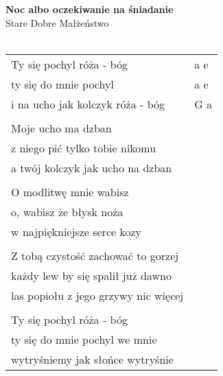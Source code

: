 \documentclass[a5paper]{article}
\begin{document}


\noindent
\fontsize{12pt}{15pt}\selectfont
\textbf{Noc albo oczekiwanie na śniadanie} \\
\fontsize{8pt}{10pt}\selectfont
Stare Dobre Małżeństwo \\ \\
\fontsize{10pt}{12pt}\selectfont
{}
\begin{tabular}{@{}p{7.50cm}p{3cm}@{}}
\noindent
Ty się pochyl róża - bóg & a e \\
ty się do mnie pochyl & a e \\
i na ucho jak kolczyk róża - bóg & G a \\ \\

Moje ucho ma dzban \\
z niego pić tylko tobie nikomu \\
a twój kolczyk jak ucho na dzban \\ \\

O modlitwę mnie wabisz\\
o, wabisz że błysk noża \\
w najpiękniejsze serce kozy  \\\\

Z tobą czystość zachować to gorzej\\ 
każdy lew by się spalił już dawno \\
las popiołu z jego grzywy nic więcej \\\\

Ty się pochyl róża - bóg \\
ty się do mnie pochyl we mnie \\
wytryśniemy jak słońce wytryśnie
\end{tabular}
\end{document}
